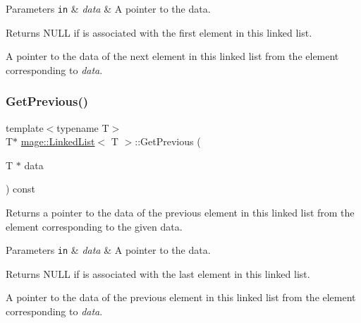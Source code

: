 \begin{DoxyParams}[1]{Parameters}
\mbox{\tt in}  & {\em data} & A pointer to the data. \\
\hline
\end{DoxyParams}
\begin{DoxyReturn}{Returns}
{\ttfamily N\+U\+LL} if  is associated with the first element in this linked list. 

A pointer to the data of the next element in this linked list from the element corresponding to {\itshape data}. 
\end{DoxyReturn}
\hypertarget{classmage_1_1_linked_list_a48a61ad79c7a7f4d460d56867ce62cf4}{}\label{classmage_1_1_linked_list_a48a61ad79c7a7f4d460d56867ce62cf4} 
\subsubsection{\texorpdfstring{Get\+Previous()}{GetPrevious()}}
{\footnotesize\ttfamily template$<$typename T$>$ \\
T$\ast$ \hyperlink{classmage_1_1_linked_list}{mage\+::\+Linked\+List}$<$ T $>$\+::Get\+Previous (\begin{DoxyParamCaption}\item[{T $\ast$}]{data }\end{DoxyParamCaption}) const}

Returns a pointer to the data of the previous element in this linked list from the element corresponding to the given data.


\begin{DoxyParams}[1]{Parameters}
\mbox{\tt in}  & {\em data} & A pointer to the data. \\
\hline
\end{DoxyParams}
\begin{DoxyReturn}{Returns}
{\ttfamily N\+U\+LL} if  is associated with the last element in this linked list. 

A pointer to the data of the previous element in this linked list from the element corresponding to {\itshape data}. 
\end{DoxyReturn}
\hypertarget{classmage_1_1_linked_list_aec571022e5fa10e0afea286e4427eb89}{}\label{classmage_1_1_linked_list_aec571022e5fa10e0afea286e4427eb89} 
